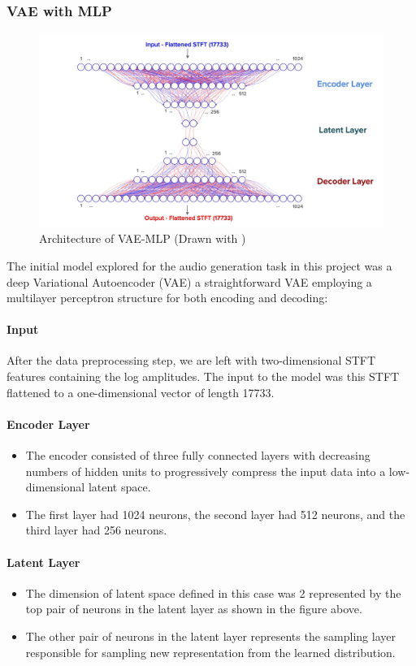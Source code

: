 \documentclass[12pt]{article}
\begin{document}
\subsubsection{VAE with MLP}
\begin{figure}[!h]
    \centering
    \includegraphics[width=1\linewidth]{figures/VAE-MLP Arch.jpg}
    \caption{Architecture of VAE-MLP (Drawn with \cite{LeNail2019})}
    \label{fig:enter-label}
\end{figure}
The initial model explored for the audio generation task in this project was a deep Variational Autoencoder (VAE) a straightforward VAE employing a multilayer perceptron structure for both encoding and decoding:

\paragraph{Input}
After the data preprocessing step, we are left with two-dimensional STFT features containing the log amplitudes. The input to the model was this STFT flattened to a one-dimensional vector of length 17733.

\paragraph{Encoder Layer}
\begin{itemize}
    \item The encoder consisted of three fully connected layers with decreasing numbers of hidden units to progressively compress the input data into a low-dimensional latent space.
    \item The first layer had 1024 neurons, the second layer had 512 neurons, and the third layer had 256 neurons.
\end{itemize}

\paragraph{Latent Layer}
\begin{itemize}
    \item The dimension of latent space defined in this case was 2 represented by the top pair of neurons in the latent layer as shown in the figure above.
    \item The other pair of neurons in the latent layer represents the sampling layer responsible for sampling new representation from the learned distribution.
\end{itemize}
\end{document}

